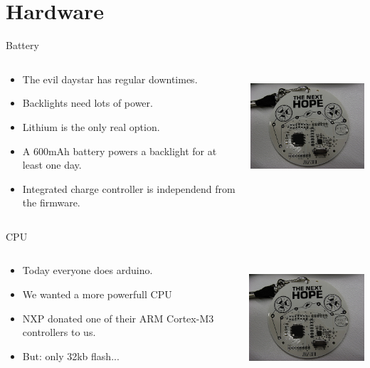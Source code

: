 \documentclass{beamer}
\begin{document}
\section{Hardware}
\begin{frame}{Battery}
  \begin{columns}
    \begin{column}{6cm}
        \begin{itemize}
		\item The evil daystar has regular downtimes.
		\item Backlights need lots of power.
		\item Lithium is the only real option.
		\item A 600mAh battery powers a backlight for at least one day.
		\item Integrated charge controller is independend from the firmware.
	\end{itemize}
    \end{column}
    \begin{column}{6cm}
        \includegraphics[height=4cm]{bilder/battery.jpg}
    \end{column}
  \end{columns}
\end{frame}
\begin{frame}{CPU}
  \begin{columns}
    \begin{column}{6cm}
        \begin{itemize}
		\item Today everyone does arduino.
		\item We wanted a more powerfull CPU
		\item NXP donated one of their ARM Cortex-M3 controllers to us.
		\item But: only 32kb flash...
	\end{itemize}
    \end{column}
    \begin{column}{6cm}
        \includegraphics[height=4cm]{bilder/cpu.jpg}
    \end{column}
  \end{columns}
\end{frame}
\end{document}

